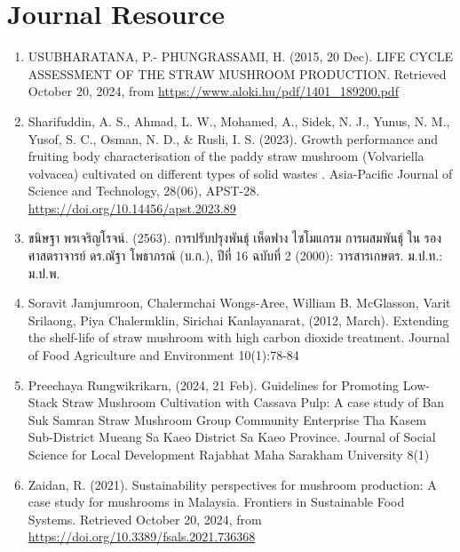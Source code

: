 \section{Journal Resource}
\begin{enumerate}
  \item USUBHARATANA, P.- PHUNGRASSAMI, H. (2015, 20 Dec). LIFE CYCLE ASSESSMENT OF THE STRAW MUSHROOM PRODUCTION. Retrieved October 20, 2024, from \url{https://www.aloki.hu/pdf/1401\_189200.pdf}
  \item Sharifuddin, A. S., Ahmad, L. W., Mohamed, A., Sidek, N. J., Yunus, N. M., Yusof, S. C., Osman, N. D., & Rusli, I. S. (2023). Growth performance and fruiting body characterisation of the paddy straw mushroom (Volvariella volvacea) cultivated on different types of solid wastes . Asia-Pacific Journal of Science and Technology, 28(06), APST-28. \url{https://doi.org/10.14456/apst.2023.89}
  \item {\T ขนิษฐา พรเจริญโรจน์}. (2563). {\T การปรับปรุงพันธุ์ เห็ดฟาง ไซโมแกรม การผสมพันธุ์  ใน รองศาสตราจารย์ ดร.ณัฐา โพธาภรณ์ (บ.ก.), ปีที่} 16 {\T ฉบับที่} 2 (2000): {\T วารสารเกษตร. ม.ป.ท.: ม.ป.พ.}
  \item Soravit Jamjumroon, Chalermchai Wongs-Aree, William B. McGlasson, Varit Srilaong, Piya Chalermklin, Sirichai Kanlayanarat, (2012, March). Extending the shelf-life of straw mushroom with high carbon dioxide treatment. Journal of Food Agriculture and Environment 10(1):78-84
  \item Preechaya Rungwikrikarn, (2024, 21 Feb). Guidelines for Promoting Low-Stack Straw Mushroom Cultivation with Cassava Pulp: A case study of Ban Suk Samran Straw Mushroom Group Community Enterprise Tha Kasem Sub-District Mueang Sa Kaeo District Sa Kaeo Province. Journal of Social Science for Local Development Rajabhat Maha Sarakham University 8(1)
  \item Zaidan, R. (2021). Sustainability perspectives for mushroom production: A case study for mushrooms in Malaysia. Frontiers in Sustainable Food Systems. Retrieved October 20, 2024, from \href{https://doi.org/10.3389/fsals.2021.736368}{https://doi.org/10.3389/fsals.2021.736368}
\end{enumerate}
